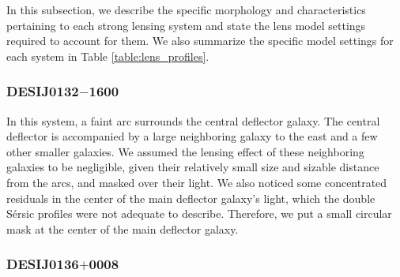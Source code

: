 \documentclass{aa}
\newcommand{\newedit}[1]{{#1}} %
\begin{document}
In this subsection, we describe the specific morphology and characteristics pertaining to each \newedit{strong lensing system} and state the lens model settings required to account for them. \newedit{We also summarize the specific model settings for each system in Table \ref{table:lens_profiles}.}







\subsubsection{DESIJ0132$-$1600}
\label{model:0132}
In this system, a faint arc surrounds the central deflector galaxy. The central deflector is accompanied by a large neighboring galaxy to the east and a few other smaller galaxies. We assumed the lensing effect of these neighboring galaxies to be negligible, given their relatively small size and sizable distance from the arcs, and masked over their light. We also noticed some concentrated residuals in the center of the main deflector galaxy's light, which the double S\'ersic profiles were not adequate to describe. Therefore, we put a small circular mask at the center of the main deflector galaxy.


\subsubsection{DESIJ0136$+$0008}\label{model:0008}

\end{document}
